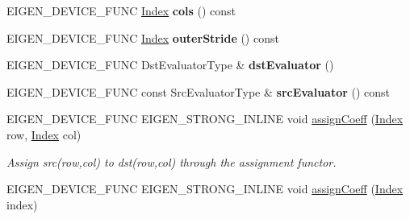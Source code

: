 \begin{DoxyCompactItemize}
E\+I\+G\+E\+N\+\_\+\+D\+E\+V\+I\+C\+E\+\_\+\+F\+U\+NC \hyperlink{namespace_eigen_a62e77e0933482dafde8fe197d9a2cfde}{Index} {\bfseries cols} () const
\item 
\mbox{\label{class_eigen_1_1internal_1_1generic__dense__assignment__kernel_a2a0cb3fa49658df28db49b4ad6bca05d}} 
E\+I\+G\+E\+N\+\_\+\+D\+E\+V\+I\+C\+E\+\_\+\+F\+U\+NC \hyperlink{namespace_eigen_a62e77e0933482dafde8fe197d9a2cfde}{Index} {\bfseries outer\+Stride} () const
\item 
\mbox{\label{class_eigen_1_1internal_1_1generic__dense__assignment__kernel_a2c7beed12a0efbd0483fd0a6b77be631}} 
E\+I\+G\+E\+N\+\_\+\+D\+E\+V\+I\+C\+E\+\_\+\+F\+U\+NC Dst\+Evaluator\+Type \& {\bfseries dst\+Evaluator} ()
\item 
\mbox{\label{class_eigen_1_1internal_1_1generic__dense__assignment__kernel_ae487f9d6cb537e16078bf2aceadfc1d7}} 
E\+I\+G\+E\+N\+\_\+\+D\+E\+V\+I\+C\+E\+\_\+\+F\+U\+NC const Src\+Evaluator\+Type \& {\bfseries src\+Evaluator} () const
\item 
\mbox{\label{class_eigen_1_1internal_1_1generic__dense__assignment__kernel_a7ca974cc4049f1ef3d6f2feac94ea35b}} 
E\+I\+G\+E\+N\+\_\+\+D\+E\+V\+I\+C\+E\+\_\+\+F\+U\+NC E\+I\+G\+E\+N\+\_\+\+S\+T\+R\+O\+N\+G\+\_\+\+I\+N\+L\+I\+NE void \hyperlink{class_eigen_1_1internal_1_1generic__dense__assignment__kernel_a7ca974cc4049f1ef3d6f2feac94ea35b}{assign\+Coeff} (\hyperlink{namespace_eigen_a62e77e0933482dafde8fe197d9a2cfde}{Index} row, \hyperlink{namespace_eigen_a62e77e0933482dafde8fe197d9a2cfde}{Index} col)
\begin{DoxyCompactList}\small\item\em Assign src(row,col) to dst(row,col) through the assignment functor. \end{DoxyCompactList}\item 
E\+I\+G\+E\+N\+\_\+\+D\+E\+V\+I\+C\+E\+\_\+\+F\+U\+NC E\+I\+G\+E\+N\+\_\+\+S\+T\+R\+O\+N\+G\+\_\+\+I\+N\+L\+I\+NE void \hyperlink{class_eigen_1_1internal_1_1generic__dense__assignment__kernel_a9f36120222600d1d843b4253b08a383b}{assign\+Coeff} (\hyperlink{namespace_eigen_a62e77e0933482dafde8fe197d9a2cfde}{Index} index)

\end{DoxyCompactItemize}
